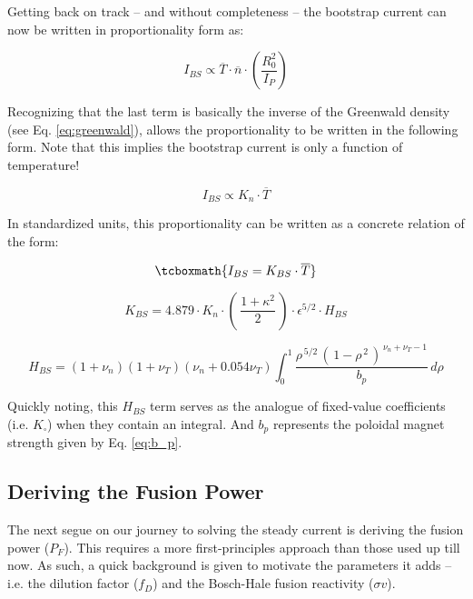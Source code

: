Getting back on track -- and without completeness -- the bootstrap current can now be written in proportionality form as:

\begin{equation}
	I_{BS} \propto \overline T \cdot \overline n \cdot \left( \frac{R_0^2}{I_P} \right)
\end{equation}

Recognizing that the last term is basically the inverse of the Greenwald density (see Eq. \ref{eq:greenwald}), allows the proportionality to be written in the following form. Note that this implies the bootstrap current is only a function of temperature!

\begin{equation}
	I_{BS} \propto K_n \cdot \overline T
\end{equation}

In standardized units, this proportionality can be written as a concrete relation of the form:

\begin{equation}
	\label{eq:ibs}
	\tcboxmath{
	I_{BS} = K_{BS} \cdot \overline T
	}
\end{equation}

\begin{equation}
  K_{BS} = 4.879 \cdot  K_n \cdot \left( \, \frac{1+\kappa^2}{2} \, \right) \cdot \epsilon^{5/2} \cdot H_{BS}
\end{equation}

\begin{equation}
  H_{BS} = ( 1 + \nu_n ) ( 1 + \nu_T ) ( \nu_n + 0.054 \nu_T ) \int_0^1 \frac{ \rho^{\,5/2} \, ( \, 1 - \rho^{\,2} \, )^{\, \nu_n + \nu_T - 1} }{b_p} \, d\rho
\end{equation}

Quickly noting, this $H_{BS}$ term serves as the analogue of fixed-value coefficients (i.e. $K_\square$) when they contain an integral. And $b_p$ represents the poloidal magnet strength given by Eq. \ref{eq:b_p}.

\subsection{Deriving the Fusion Power}

The next segue on our journey to solving the steady current is deriving the fusion power ($P_F$). This requires a more first-principles approach than those used up till now. As such, a quick background is given to motivate the parameters it adds -- i.e. the dilution factor ($f_{D}$) and the Bosch-Hale fusion reactivity ($\sigma v$).

